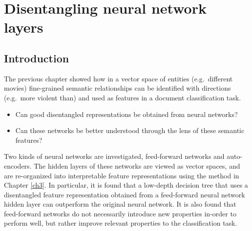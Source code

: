 \chapter{Disentangling neural network layers}\label{ch4}


\section{Introduction}

The previous chapter showed how in a vector space of entities (e.g.\ different movies) fine-grained semantic relationships can be identified with directions (e.g.\ more violent than) and used as features in a document classification task. 

\begin{itemize}
	\item{Can good disentangled representations be obtained from neural networks?}
	\item{Can these networks be better understood through the lens of these semantic features?}
\end{itemize}

Two kinds of neural networks are investigated, feed-forward networks and auto-encoders. The hidden layers of these networks are viewed as vector spaces, and are re-organized into interpretable feature representations using the method in Chapter \ref{ch3}.   In particular, it is found that a low-depth decision tree that uses a disentangled feature representation obtained from a feed-forward neural network hidden layer can outperform the original neural network. It is also found that feed-forward networks do not necessarily introduce new properties in-order to perform well, but rather improve relevant properties to the classification task.


